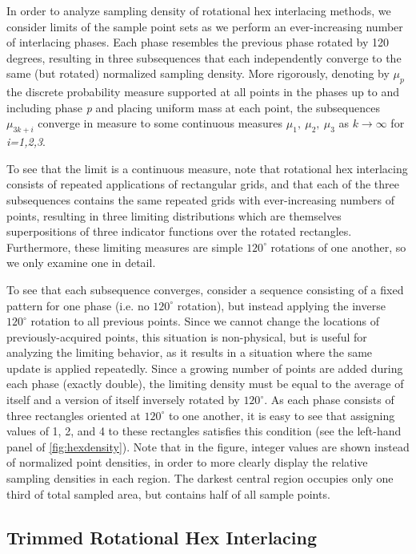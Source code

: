 \documentclass[aip, amsmath, amssymb, nobibnotes, nofootinbib, citeautoscript, reprint, superscriptaddress]{revtex4-2}
\begin{document}
    In order to analyze sampling density of rotational hex interlacing methods, we consider limits of the sample point sets as we perform an ever-increasing number of interlacing phases.
    Each phase resembles the previous phase rotated by 120 degrees, resulting in three subsequences that each independently converge to the same (but rotated) normalized sampling density.
    More rigorously, denoting by $\mu_p$ the discrete probability measure supported at all points in the phases up to and including phase \textit{p} and placing uniform mass at each point, the subsequences $\mu_{3k+i}$ converge in measure to some continuous measures $\mu_1,\ \mu_2,\ \mu_3$ as $k\to\infty$ for \textit{i=1,2,3}.


    To see that the limit is a continuous measure, note that rotational hex interlacing consists of repeated applications of rectangular grids, and that each of the three subsequences contains the same repeated grids with ever-increasing numbers of points, resulting in three limiting distributions which are themselves superpositions of three indicator functions over the rotated rectangles.
    Furthermore, these limiting measures are simple $120^{\circ}$ rotations of one another, so we only examine one in detail.


    To see that each subsequence converges, consider a sequence consisting of a fixed pattern for one phase (i.e. no $120^{\circ}$ rotation), but instead applying the inverse $120^{\circ}$ rotation to all previous points.
    Since we cannot change the locations of previously-acquired points, this situation is non-physical, but is useful for analyzing the limiting behavior, as it results in a situation where the same update is applied repeatedly.
    Since a growing number of points are added during each phase (exactly double), the limiting density must be equal to the average of itself and a version of itself inversely rotated by $120^{\circ}$.
    As each phase consists of three rectangles oriented at $120^{\circ}$ to one another, it is easy to see that assigning values of 1, 2, and 4 to these rectangles satisfies this condition (see the left-hand panel of \autoref{fig:hexdensity}).
    Note that in the figure, integer values are shown instead of normalized point densities, in order to more clearly display the relative sampling densities in each region.
    The darkest central region occupies only one third of total sampled area, but contains half of all sample points.

    \subsection{\label{ssec:trimmed}Trimmed Rotational Hex Interlacing}
\end{document}
